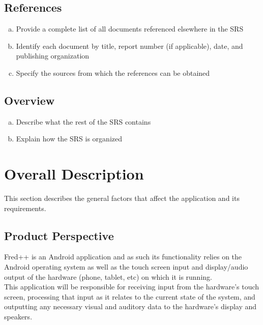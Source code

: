 \documentclass[]{article}
\begin{document}
\subsection{References}
\label{sub:references}
\begin{enumerate}[a)]
	\item Provide a complete list of all documents referenced elsewhere in the SRS
	\item Identify each document by title, report number (if applicable), date, and publishing organization
	\item Specify the sources from which the references can be obtained
\end{enumerate}

\subsection{Overview}
\label{sub:overview}
\begin{enumerate}[a)]
	\item Describe what the rest of the SRS contains
	\item Explain how the SRS is organized
\end{enumerate}


\section{Overall Description}
\label{sec:overall_description}

This section describes the general factors that affect the application and its 
requirements.

\subsection{Product Perspective}
\label{sub:product_perspective}
	Fred++ is an Android application and as such its functionality relies on 
	the Android operating system as well as the touch screen input and 
	display/audio output of the hardware (phone, tablet, etc) on which it is 
	running.\\
	This application will be responsible for receiving input from the 
	hardware's touch screen, processing that input as it relates to the current 
	state of the system, and outputting any necessary visual and auditory data 
	to the hardware's display and speakers.
\end{document}
